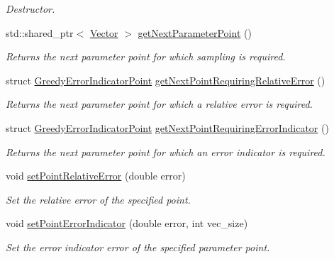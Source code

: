 \begin{DoxyCompactItemize}
\begin{DoxyCompactList}\small\item\em Destructor. \end{DoxyCompactList}\item 
std\-::shared\-\_\-ptr$<$ \hyperlink{class_c_a_r_o_m_1_1_vector}{Vector} $>$ \hyperlink{class_c_a_r_o_m_1_1_greedy_parameter_point_sampler_a359a485b497ad2ccb3ff022e7eefd4e5}{get\-Next\-Parameter\-Point} ()
\begin{DoxyCompactList}\small\item\em Returns the next parameter point for which sampling is required. \end{DoxyCompactList}\item 
struct \hyperlink{struct_c_a_r_o_m_1_1_greedy_error_indicator_point}{Greedy\-Error\-Indicator\-Point} \hyperlink{class_c_a_r_o_m_1_1_greedy_parameter_point_sampler_a12c3b6cfb54400f42ab4a5d70d8da7b3}{get\-Next\-Point\-Requiring\-Relative\-Error} ()
\begin{DoxyCompactList}\small\item\em Returns the next parameter point for which a relative error is required. \end{DoxyCompactList}\item 
struct \hyperlink{struct_c_a_r_o_m_1_1_greedy_error_indicator_point}{Greedy\-Error\-Indicator\-Point} \hyperlink{class_c_a_r_o_m_1_1_greedy_parameter_point_sampler_a410ad02c1c7d95bf3ab6c8a2ad763f37}{get\-Next\-Point\-Requiring\-Error\-Indicator} ()
\begin{DoxyCompactList}\small\item\em Returns the next parameter point for which an error indicator is required. \end{DoxyCompactList}\item 
void \hyperlink{class_c_a_r_o_m_1_1_greedy_parameter_point_sampler_a23bc3cf3e3e2d0db1e9f7b25b6d1904e}{set\-Point\-Relative\-Error} (double error)
\begin{DoxyCompactList}\small\item\em Set the relative error of the specified point. \end{DoxyCompactList}\item 
void \hyperlink{class_c_a_r_o_m_1_1_greedy_parameter_point_sampler_ac0484e64c0a899d01ddf34c064f7f9f9}{set\-Point\-Error\-Indicator} (double error, int vec\-\_\-size)
\begin{DoxyCompactList}\small\item\em Set the error indicator error of the specified parameter point. \end{DoxyCompactList}\item 

\end{DoxyCompactItemize}
